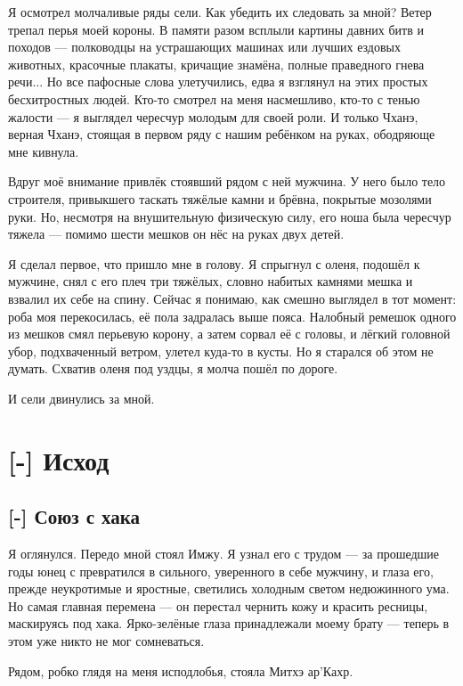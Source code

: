 Я осмотрел молчаливые ряды сели.
Как убедить их следовать за мной?
Ветер трепал перья моей короны.
В памяти разом всплыли картины давних битв и походов --- полководцы на устрашающих машинах или лучших ездовых животных, красочные плакаты, кричащие знамёна, полные праведного гнева речи...
Но все пафосные слова улетучились, едва я взглянул на этих простых бесхитростных людей.
Кто-то смотрел на меня насмешливо, кто-то с тенью жалости --- я выглядел чересчур молодым для своей роли.
И только Чханэ, верная Чханэ, стоящая в первом ряду с нашим ребёнком на руках, ободряюще мне кивнула.

Вдруг моё внимание привлёк стоявший рядом с ней мужчина.
У него было тело строителя, привыкшего таскать тяжёлые камни и брёвна, покрытые мозолями руки.
Но, несмотря на внушительную физическую силу, его ноша была чересчур тяжела --- помимо шести мешков он нёс на руках двух детей.

Я сделал первое, что пришло мне в голову.
Я спрыгнул с оленя, подошёл к мужчине, снял с его плеч три тяжёлых, словно набитых камнями мешка и взвалил их себе на спину.
Сейчас я понимаю, как смешно выглядел в тот момент: роба моя перекосилась, её пола задралась выше пояса.
Налобный ремешок одного из мешков смял перьевую корону, а затем сорвал её с головы, и лёгкий головной убор, подхваченный ветром, улетел куда-то в кусты.
Но я старался об этом не думать.
Схватив оленя под уздцы, я молча пошёл по дороге.

И сели двинулись за мной.

\chapter{[-] Исход}

\section{[-] Союз с хака}

\textspace

Я оглянулся.
Передо мной стоял Имжу.
Я узнал его с трудом --- за прошедшие годы юнец с превратился в сильного, уверенного в себе мужчину, и глаза его, прежде неукротимые и яростные, светились холодным светом недюжинного ума.
Но самая главная перемена --- он перестал чернить кожу и красить ресницы, маскируясь под хака.
Ярко-зелёные глаза принадлежали моему брату --- теперь в этом уже никто не мог сомневаться.

Рядом, робко глядя на меня исподлобья, стояла Митхэ ар’Кахр.

